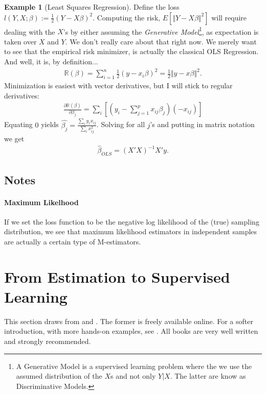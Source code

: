 \documentclass[12pt,a4paper]{article}
\theoremstyle{plain}
\theoremstyle{definition}
\newtheorem{example}{Example}
\newcommand{\expect}[1]{E[#1]}
\newcommand{\norm}[1]{\Vert #1 \Vert}
\newcommand{\loss}{l}
\newcommand{\riskn}{\mathbb{R}}
\newcommand{\deriv}[2]{\frac{\partial #1}{\partial #2}}
\begin{document}
\begin{example}[Least Squares Regression]
\label{eg:OLS}
Define the loss $\loss(Y,X;\beta):=\frac{1}{2}(Y-X\beta)^2$.
Computing the risk, $\expect{\norm{Y-X\beta}^2}$ will require dealing with the $X$'s by either assuming the \emph{Generative Model}\footnote{A Generative Model is a supervised learning problem where the we use the assumed distribution of the $X$s and not only $Y|X$. The latter are know as Discriminative Models.}, as expectation is taken over $X$ and $Y$. 
We don't really care about that right now. 
We merely want to see that the empirical risk minimizer, is actually the classical OLS Regression. And well, it is, by definition...
\begin{align*}
	\riskn(\beta)=\sum_{i=1}^n 	\frac{1}{2}(y-x_i\beta)^2 = \frac{1}{2}\norm{y-x\beta}^2.
\end{align*}
Minimization is easiest with vector derivatives, but I will stick to regular derivatives:
\begin{align*}
	\deriv{\riskn(\beta)}{{\beta_j}} = \sum_i \left[ (y_i-\sum_{j=1}^p x_{ij}\beta_j)(-x_{ij}) \right]
\end{align*}
Equating $0$ yields $\hat{\beta_j}=\frac{\sum_i y_i x_{ij}}{\sum_i x_{ij}^2}$.
Solving for all $j$'s and putting in matrix notation we get
\begin{align}
	\hat{\beta}_{OLS}=(X'X)^{-1} X'y.
\end{align}


\end{example}


\subsection{Notes}
\paragraph{Maximum Likelhood} 
If we set the loss function to be the negative log likelihood of the (true) sampling distribution, we see that maximum likelihood estimators in independent samples are actually a certain type of M-estimators.


\section{From Estimation to Supervised Learning}
\label{sec:learning}
This section draws from \cite{hastie_elements_2003} and \cite{shalev-shwartz_understanding_2014}.
The former is freely available online.
For a softer introduction, with more hands-on examples, see \cite{james_introduction_2013}.
All books are very well written and strongly recommended.
\end{document}
